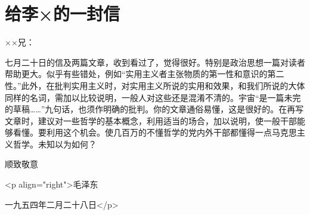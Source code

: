 \section[给李×的一封信（一九五四年二月二十八日）]{给李×的一封信}


××兄：

七月二十日的信及两篇文章，收到看过了，觉得很好。特别是政治思想一篇对读者帮助更大。似乎有些错处，例如“实用主义者主张物质的第一性和意识的第二性。”此外，在批判实用主义时，对实用主义所说的实用和效果，和我们所说的大体同样的名词，需加以比较说明，一般人对这些还是混淆不清的。宇宙“是一篇未完的草稿……”九句话，也须作明确的批判。你的文章通俗易懂，这是很好的。在再写文章时，建议对一些哲学的基本概念，利用适当的场合，加以说明，使一般干部能够看懂。要利用这个机会。使几百万的不懂哲学的党内外干部都懂得一点马克思主义哲学。未知以为如何？

顺致敬意

<p align="right">毛泽东

一九五四年二月二十八日</p>


